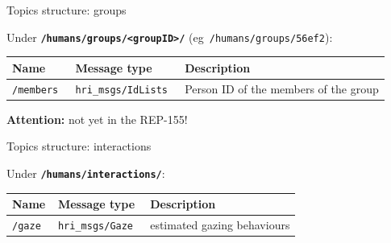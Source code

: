 \documentclass[xcolor=table]{beamer}
\begin{document}
\begin{frame}{Topics structure: groups}

    Under \textbf{\texttt{/humans/groups/<groupID>/}} (eg~\texttt{/humans/groups/56ef2}):

    \scriptsize
    \begin{tabular}{@{}llp{4cm}@{}}
        \toprule
        \textbf{Name} & \textbf{Message type}         & \textbf{Description}                                                \\ \midrule
        \texttt{/members                } & \texttt{hri\_msgs/IdLists         }  & Person ID of the members of the group  \\
\bottomrule
\end{tabular}

    \vspace{1em}\textbf{Attention:} not yet in the REP-155!
    
\end{frame}

\begin{frame}{Topics structure: interactions}

    Under \textbf{\texttt{/humans/interactions/}}:

    \scriptsize
    \begin{tabular}{@{}llp{4cm}@{}}
        \toprule
        \textbf{Name} & \textbf{Message type}         & \textbf{Description}                                                \\ \midrule
        \texttt{/gaze    } & \texttt{hri\_msgs/Gaze         }  & estimated gazing behaviours    \\
\bottomrule
\end{tabular}
    
\end{frame}
\end{document}
